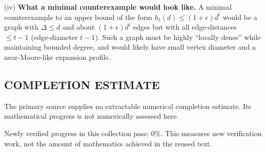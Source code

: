 (iv) \textbf{What a minimal counterexample would look like.}
A minimal counterexample to an upper bound of the form $h_t(d)\le (1+\epsilon)d^t$ would be a graph with $\Delta\le d$ and about $(1+\epsilon)d^t$ edges but with all edge-distances $\le t-1$ (edge-diameter $t-1$). Such a graph must be highly ``locally dense'' while maintaining bounded degree, and would likely have small vertex diameter and a near-Moore-like expansion profile.



\subsection*{COMPLETION ESTIMATE}
The primary source supplies no extractable numerical completion estimate. Its mathematical progress is not numerically assessed here.

Newly verified progress in this collection pass: $0\%$. This measures new verification work, not the amount of mathematics achieved in the reused text.
